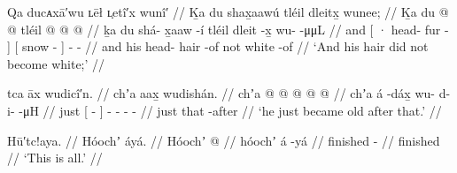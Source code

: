 
\ex\label{ex:100-232-and-no-white-hair}%
%
\begingl
	\glpreamble	Qa ducᴀxā′wu ʟēł ʟ̣etî′x wunî′ //
	\glpreamble	Ḵa du shax̱aawú tléil dleitx̱ wunee; //
	\gla	Ḵa {} du  @ {} @ {} {}
		tléil
		{}  @ {} {} 
		 @ {} @ {} //
	\glb	ḵa {} du shá- x̱aaw -í {}
		tléil
		{} dleit -x̱ {} 
		wu-  -μμL //
	\glc	and {}[ · head- fur - {}]
		{}[ snow - {}]
		-  - //
	\gld	and {} his head- hair -of {}
		not
		{} white -of {} 
		 {} {} {} {} {} //
	\glft	‘And his hair did not become white;’
		//
\endgl
\xe

\ex\label{ex:100-234-just-old}%
%
\begingl
	\glpreamble	tca āx wudicî′n. //
	\glpreamble	chʼa aax̱ wudishán. //
	\gla	chʼa {}  @ {} {} 
		 @ {} @ {} @ {} @ {} //
	\glb	chʼa {} á -dáx̱ {}
		wu- d- i-  -μH //
	\glc	just {}[  - {}]
		- - -  - //
	\gld	just {} that -after {} 
		 {} {} {} {} //
	\glft	‘he just became old after that.’
		//
\endgl
\xe

\ex\label{ex:100-235-all-done}%
%
\begingl
	\glpreamble	Hū′tc!aya. //
	\glpreamble	Hóochʼ áyá. //
	\gla	Hóochʼ  @ {} //
	\glb	hóochʼ á -yá //
	\glc	finished  - //
	\gld	finished  {} //
	\glft	‘This is all.’
		//
\endgl
\xe

